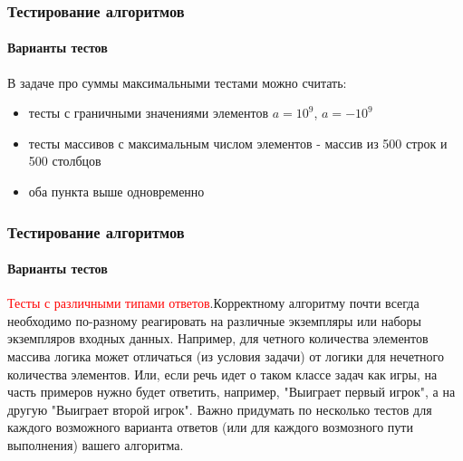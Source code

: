 \documentclass[aspectratio=169]{beamer}
\begin{document}
\begin{frame}
\frametitle{Тестирование алгоритмов}
\framesubtitle{Варианты тестов}
\justifying
\small
В задаче про суммы максимальными тестами можно считать:
\begin{itemize}
\item{тесты с граничными значениями элементов $a = 10^9$, $a = -10^9$}
\item{тесты массивов с максимальным числом элементов - массив из 500 строк и 500 столбцов}
\item{оба пункта выше одновременно}
\end{itemize}

\begin{figure}
    \captionsetup[subfigure]{labelformat=empty}
    \centering
\end{figure}
\end{frame}

\begin{frame}
\frametitle{Тестирование алгоритмов}
\framesubtitle{Варианты тестов}
\justifying
\textcolor{red}{Тесты с различными типами ответов}.\newline Корректному алгоритму почти всегда необходимо по-разному реагировать на различные экземпляры или наборы экземпляров входных данных.\newline\newline
Например, для четного количества элементов массива логика может отличаться (из условия задачи) от логики для нечетного количества элементов.\newline\newline
Или, если речь идет о таком классе задач как игры, на часть примеров нужно будет ответить, например, "Выиграет первый игрок", а на другую "Выиграет второй игрок".\newline\newline
Важно придумать по несколько тестов для каждого возможного варианта ответов (или для каждого возмозного пути выполнения) вашего алгоритма.

\end{frame}
\end{document}
